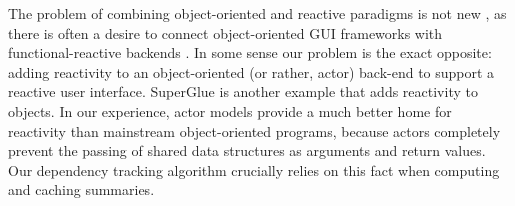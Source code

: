 The problem of combining object-oriented and reactive paradigms is not new \cite{Salvaneschi:2013:RBO:2451436.2451442}, as there is often a desire to connect object-oriented GUI frameworks with functional-reactive backends \cite{statelines}. In some sense our problem is the exact opposite: adding reactivity to an object-oriented (or rather, actor) back-end to support a reactive user interface.  SuperGlue \cite{superglue} is another example that adds reactivity to objects. In our experience, actor models provide a much better home for reactivity than mainstream object-oriented programs, because actors completely prevent the passing of shared data structures as arguments and return values. Our dependency tracking algorithm crucially relies on this fact when computing and caching summaries.



